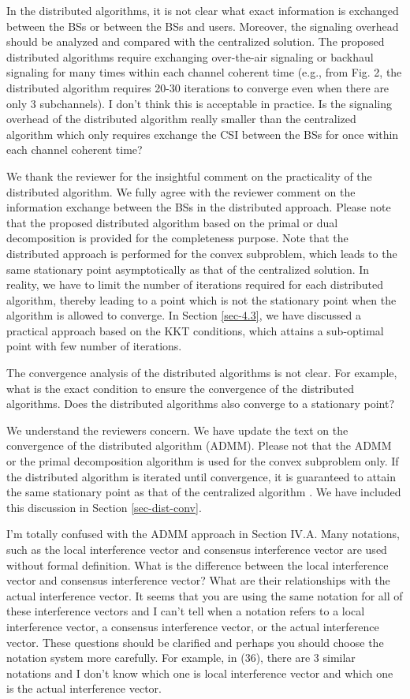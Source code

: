  In the distributed algorithms, it is not clear what exact information is exchanged between the BSs or between the BSs and users. Moreover, the signaling overhead should be analyzed and compared with the centralized solution. The proposed distributed algorithms require exchanging over-the-air signaling or backhaul signaling for many times within each channel coherent time (e.g., from Fig. 2, the distributed algorithm requires 20-30 iterations to converge even when there are only 3 subchannels). I don’t think this is acceptable in practice. Is the signaling overhead of the distributed algorithm really smaller than the centralized algorithm which only requires exchange the CSI between the BSs for once within each channel coherent time?

\resp We thank the reviewer for the insightful comment on the practicality of the distributed algorithm. We fully agree with the reviewer comment on the information exchange between the BSs in the distributed approach. Please note that the proposed distributed algorithm based on the primal or dual decomposition is provided for the completeness purpose. Note that the distributed approach is performed for the convex subproblem, which leads to the same stationary point asymptotically as that of the centralized solution. In reality, we have to limit the number of iterations required for each distributed algorithm, thereby leading to a point which is not the stationary point when the algorithm is allowed to converge. In Section \ref{sec-4.3}, we have discussed a practical approach based on the KKT conditions, which attains a sub-optimal point with few number of iterations.

 The convergence analysis of the distributed algorithms is not clear. For example, what is the exact condition to ensure the convergence of the distributed algorithms. Does the distributed algorithms also converge to a stationary point?

\resp We understand the reviewers concern. We have update the text on the convergence of the distributed algorithm (ADMM). Please not that the ADMM or the primal decomposition algorithm is used for the convex subproblem only. If the distributed algorithm is iterated until convergence, it is guaranteed to attain the same stationary point as that of the centralized algorithm \cite{boyd2011distributed}. We have included this discussion in Section \ref{sec-dist-conv}.

 I’m totally confused with the ADMM approach in Section IV.A. Many notations, such as the local interference vector and consensus interference vector are used without formal definition. What is the difference between the local interference vector and consensus interference vector? What are their relationships with the actual interference vector. It seems that you are using the same notation for all of these interference vectors and I can’t tell when a notation refers to a local interference vector, a consensus interference vector, or the actual interference vector. These questions should be clarified and perhaps you should choose the notation system more carefully. For example, in (36), there are 3 similar notations and I don’t know which one is local interference vector and which one is the actual interference vector.

